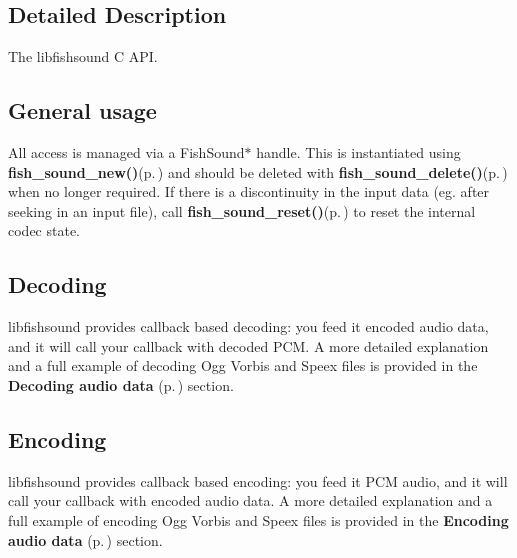 

\subsection{Detailed Description}
The libfishsound C API. 

\subsection{General usage}\label{general}
All access is managed via a Fish\-Sound$\ast$ handle. This is instantiated using {\bf fish\_\-sound\_\-new()}{\rm (p.\,\pageref{fishsound_8h_a4})} and should be deleted with {\bf fish\_\-sound\_\-delete()}{\rm (p.\,\pageref{fishsound_8h_a11})} when no longer required. If there is a discontinuity in the input data (eg. after seeking in an input file), call {\bf fish\_\-sound\_\-reset()}{\rm (p.\,\pageref{fishsound_8h_a10})} to reset the internal codec state.\subsection{Decoding}\label{decoding}
libfishsound provides callback based decoding: you feed it encoded audio data, and it will call your callback with decoded PCM. A more detailed explanation and a full example of decoding Ogg Vorbis and Speex files is provided in the {\bf Decoding audio data }{\rm (p.\,\pageref{group__decode})} section.\subsection{Encoding}\label{encoding}
libfishsound provides callback based encoding: you feed it PCM audio, and it will call your callback with encoded audio data. A more detailed explanation and a full example of encoding Ogg Vorbis and Speex files is provided in the {\bf Encoding audio data }{\rm (p.\,\pageref{group__encode})} section.

